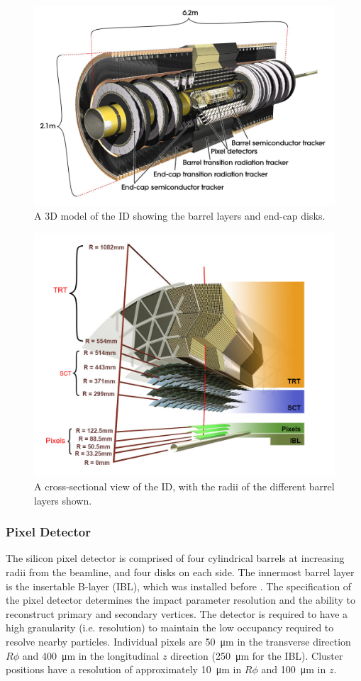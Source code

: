 \begin{figure}[!htpb]
  \centering
  \includegraphics[width=0.75\linewidth]{chapters/2.detector/figs/atlas_id.jpg}
  \caption{A 3D model of the \ATLAS ID showing the barrel layers and end-cap disks.}
  \label{fig:atlas_id_run1}
\end{figure}
%
\begin{figure}[!htpb]
  \centering
  \includegraphics[width=0.75\linewidth]{chapters/2.detector/figs/atlas_id_xs.png}
  \caption{A cross-sectional view of the \ATLAS ID, with the radii of the different barrel layers shown.}
  \label{fig:atlas_id_run2}
\end{figure}
%

\subsubsection{Pixel Detector}
The silicon pixel detector is comprised of four cylindrical barrels at increasing radii from the beamline, and four disks on each side.
The innermost barrel layer is the insertable B-layer (IBL), which was installed before \runtwo \cite{ATLAS-TDR-19,PIX-2018-001}.
The specification of the pixel detector determines the impact parameter resolution and the ability to reconstruct primary and secondary vertices.
The detector is required to have a high granularity (i.e. resolution) to maintain the low occupancy required to resolve nearby particles. %
Individual pixels are \SI{50}{\micro\meter} in the transverse direction $R\phi$ and \SI{400}{\micro\meter} in the longitudinal $z$ direction (\SI{250}{\micro\meter} for the IBL).
Cluster positions have a resolution of approximately \SI{10}{\micro\meter} in $R\phi$ and \SI{100}{\micro\meter} in $z$.

